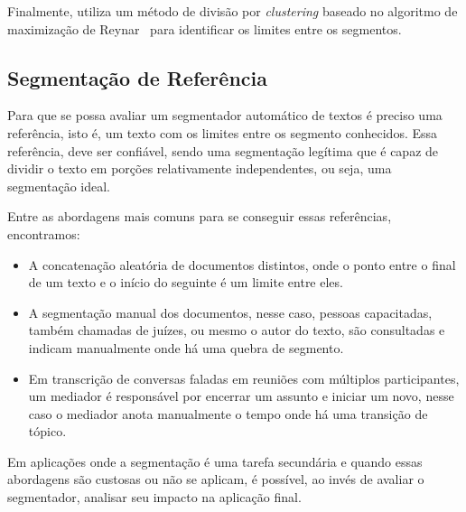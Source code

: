 Finalmente, utiliza um método de divisão por \textit{clustering} baseado no algoritmo de maximização de Reynar~\cite{Reynar1998} para identificar os limites entre os segmentos. 




\subsection{Segmentação de Referência} %


Para que se possa avaliar um segmentador automático de textos é preciso uma referência, isto é, um texto com os limites entre os segmento conhecidos. Essa referência, deve ser confiável, sendo uma segmentação legítima que é capaz de dividir o texto em porções relativamente independentes, ou seja, uma segmentação ideal.



Entre as abordagens mais comuns para se conseguir essas referências, encontramos: 

\begin{itemize}

\item A concatenação aleatória de documentos distintos, onde o ponto entre o final de um texto e o início do seguinte é um limite entre eles. 

\item A segmentação manual dos documentos, nesse caso, pessoas capacitadas, também chamadas de juízes, ou mesmo o autor do texto, são consultadas e indicam manualmente onde há uma quebra de segmento. 
\item Em transcrição de conversas faladas em reuniões com múltiplos participantes, um mediador é responsável por encerrar um assunto e iniciar um novo, nesse caso o mediador anota manualmente o tempo onde há uma transição de tópico. 

\end{itemize}

Em aplicações onde a segmentação é uma tarefa secundária e quando essas abordagens são custosas ou não se aplicam, é possível, ao invés de avaliar o segmentador, analisar seu impacto na aplicação final.











